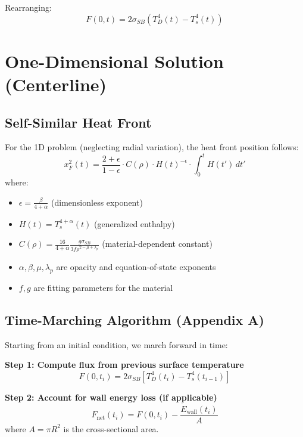\documentclass[12pt,a4paper]{article}
\begin{document}
Rearranging:
\begin{equation}
F(0,t) = 2\sigma_{SB}\left(T_D^4(t) - T_s^4(t)\right)
\end{equation}

\section{One-Dimensional Solution (Centerline)}

\subsection{Self-Similar Heat Front}

For the 1D problem (neglecting radial variation), the heat front position follows:
\begin{equation}
x_F^2(t) = \frac{2+\epsilon}{1-\epsilon} \cdot C(\rho) \cdot H(t)^{-\epsilon} \cdot \int_0^t H(t') \, dt'
\end{equation}
where:
\begin{itemize}
    \item $\epsilon = \frac{\beta}{4+\alpha}$ (dimensionless exponent)
    \item $H(t) = T_s^{4+\alpha}(t)$ (generalized enthalpy)
    \item $C(\rho) = \frac{16}{4+\alpha} \frac{g\sigma_{SB}}{3f\rho^{2-\mu+\lambda_p}}$ (material-dependent constant)
    \item $\alpha, \beta, \mu, \lambda_p$ are opacity and equation-of-state exponents
    \item $f, g$ are fitting parameters for the material
\end{itemize}

\subsection{Time-Marching Algorithm (Appendix A)}

Starting from an initial condition, we march forward in time:

\textbf{Step 1: Compute flux from previous surface temperature}
\begin{equation}
F(0, t_i) = 2\sigma_{SB}\left[T_D^4(t_i) - T_s^4(t_{i-1})\right]
\end{equation}

\textbf{Step 2: Account for wall energy loss (if applicable)}
\begin{equation}
F_{\text{net}}(t_i) = F(0, t_i) - \frac{\dot{E}_{\text{wall}}(t_i)}{A}
\end{equation}
where $A = \pi R^2$ is the cross-sectional area.
\end{document}
